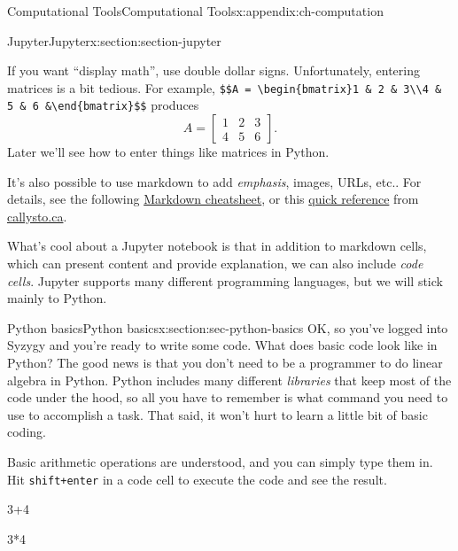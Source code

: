 \documentclass[oneside,10pt,]{book}
\newcommand{\mono}[1]{\texttt{#1}}
\numberwithin{equation}{section}
\newcommand{\amp}{&}
\begin{document}
\begin{appendixptx}{Computational Tools}{}{Computational Tools}{}{}{x:appendix:ch-computation}
\begin{sectionptx}{Jupyter}{}{Jupyter}{}{}{x:section:section-jupyter}
\par
If you want ``display math'', use double dollar signs. Unfortunately, entering matrices is a bit tedious. For example, \mono{\$\$A = \textbackslash{}begin\{bmatrix\}1 \& 2 \& 3\textbackslash{}\textbackslash{}4 \& 5 \& 6 \&\textbackslash{}end\{bmatrix\}\$\$} produces%
\begin{equation*}
A = \begin{bmatrix}1\amp 2\amp 3\\4\amp 5\amp 6\end{bmatrix}\text{.}
\end{equation*}
Later we'll see how to enter things like matrices in Python.%
\par
It's also possible to use markdown to add \emph{emphasis}, images, URLs, etc.\@. For details, see the following \href{https://github.com/adam-p/markdown-here/wiki/Markdown-Cheatsheet}{Markdown cheatsheet}, or this \href{https://callysto.ca/wp-content/uploads/2018/12/Callysto-Cheatsheet_12.19.18_web.pdf}{quick reference} from \href{https://callysto.ca/}{callysto.ca}.%
\par
What's cool about a Jupyter notebook is that in addition to markdown cells, which can present content and provide explanation, we can also include \emph{code cells}. Jupyter supports many different programming languages, but we will stick mainly to Python.%
\end{sectionptx}
%
%
\typeout{************************************************}
\typeout{************************************************}
%
\begin{sectionptx}{Python basics}{}{Python basics}{}{}{x:section:sec-python-basics}
OK, so you've logged into Syzygy and you're ready to write some code. What does basic code look like in Python? The good news is that you don't need to be a programmer to do linear algebra in Python. Python includes many different \emph{libraries} that keep most of the code under the hood, so all you have to remember is what command you need to use to accomplish a task. That said, it won't hurt to learn a little bit of basic coding.%
\par
Basic arithmetic operations are understood, and you can simply type them in. Hit \mono{shift+enter} in a code cell to execute the code and see the result.%
\begin{sageinput}
3+4
\end{sageinput}
\begin{sageinput}
3*4
\end{sageinput}

\end{sectionptx}
\end{appendixptx}
\end{document}
